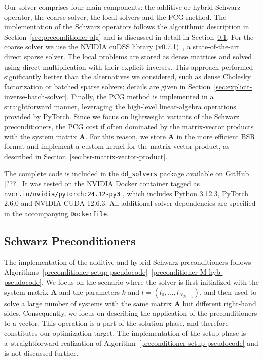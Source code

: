 \documentclass[11pt]{article}
\theoremstyle{definition}
\theoremstyle{theorem}
\begin{document}
Our solver comprises four main components: the additive or hybrid Schwarz
operator, the coarse solver, the local solvers and the PCG method. The implementation
of the Schwarz operators follows the algorithmic description in Section~\ref{sec:preconditioner-alg}
and is discussed in detail in Section~\ref{sec:schwarz-preconditioners}.
For the coarse solver we use the NVIDIA cuDSS library (v0.7.1)~\cite{cudss},
a state-of-the-art direct sparse solver. The local problems are stored as
dense matrices and solved using direct multiplication with their explicit inverses.
This approach performed significantly better than the alternatives we considered, such
as dense Cholesky factorization or batched sparse solvers; details are given
in Section~\ref{sec:explicit-inverse-batch-solver}.
Finally, the PCG method is implemented in a straightforward manner, leveraging the
high-level linear-algebra operations provided by PyTorch. Since we focus
on lightweight variants of the Schwarz preconditioners, the PCG cost
if often dominated by the matrix-vector products with the system matrix $\bm{A}$.
For this reason, we store $\bm{A}$ in the more efficient BSR format and implement
a custom kernel for the matrix-vector product, as described in Section~\ref{sec:bsr-matrix-vector-product}.

The complete code is included in the \texttt{dd\_solvers} package
available on GitHub [???]. It was tested on the NVIDIA Docker container tagged as
\texttt{nvcr.io/nvidia/pytorch:24.12-py3} \cite{pytorch-ngc}, which includes
Python 3.12.3, PyTorch 2.6.0 and NVIDIA CUDA 12.6.3. All additional solver
dependencies are specified in the accompanying \texttt{Dockerfile}.

\subsection{Schwarz Preconditioners}
\label{sec:schwarz-preconditioners}

The implementation of the additive and hybrid Schwarz preconditioners
follows Algorithms~\ref{preconditioner-setup-pseudocode}--\ref{preconditioner-M-hyb-pseudocode}.
We focus on the scenario where the solver is first initialized with
the system matrix $\bm{A}$ and the parameters $k$ and
$l=(l_0, ..., l_{N_{\mathcal{H}-1}})$, and then used to solve
a large number of systems with the same matrix $\bm{A}$ but different right-hand sides.
Consequently, we focus on describing the application of the preconditioners to
a vector. This operation is a part of the solution phase, and therefore constitutes
our optimization target. The implementation of the setup phase is a~straightforward
realization of Algorithm~\ref{preconditioner-setup-pseudocode} and is not
discussed further.
\end{document}
